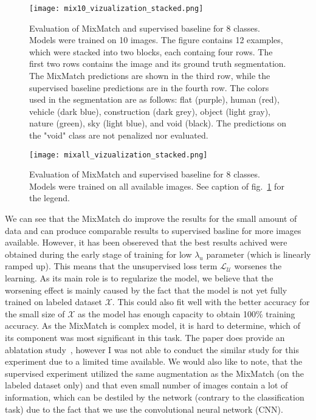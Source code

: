 \begin{figure}[t]
    \centering
    \texttt{[image: mix10\_vizualization\_stacked.png]}
    \caption[Mixmatch result visualization (10)]{Evaluation of MixMatch and supervised baseline for 8 classes. Models were trained on 10 images. 
    The figure contains 12 examples, which were stacked into two blocks, each containg four rows. 
    The first two rows contains the image and its ground truth segmentation. The MixMatch predictions are shown in the third row, 
    while the supervised baseline predictions are in the fourth row. \newline
     The colors used in the segmentation are as follows: flat (purple), human (red), vehicle (dark blue), construction (dark grey), 
     object (light gray), nature (green), sky (light blue), and void (black). The predictions on the "void"
    class are not penalized nor evaluated.}
    \label{fig:mixmatch_visualization_10}
\end{figure}

\begin{figure}[t]
    \centering
    \texttt{[image: mixall\_vizualization\_stacked.png]}
    \caption[Mixmatch result visualization (All)]{Evaluation of MixMatch and supervised baseline for 8 classes. Models were trained on all available images.
    See caption of fig.~\ref{fig:mixmatch_visualization_10} for the legend.}
    \label{fig:mixmatch_visualization_all}
\end{figure}

We can see that the MixMatch do improve the results for the small amount of data and can produce comparable results to supervised basline 
for more images available. However, it has been obsereved that the best results achived were obtained during the early stage of training for low $\lambda_u$
parameter (which is linearly ramped up). This means that the unsupervised loss term $\mathcal{L}_{\mathcal{U}}$ worsenes the learning. 
As its main role is to regularize the model, we believe that the worsening effect is mainly caused by the fact that the model is not yet fully 
trained on labeled dataset $\mathcal{X}$. This could also fit well with the better accuracy for the small size of $\mathcal{X}$ as the model 
has enough capacity to obtain 100\% training accuracy. As the MixMatch is complex model, it is hard to determine, which of its
component was most significant in this task. The paper does provide an ablatation study~\cite{mixmatch-2019}, however I was not able to 
conduct the similar study for this experiment due to a limited time available. We would also like to note, that the supervised experiment utilized the same augmentation as 
the MixMatch (on the labeled dataset only) and that even small number of images contain a lot of information, which can be destiled by the network
(contrary to the classification task) due to the fact that we use the convolutional neural network (CNN). 

